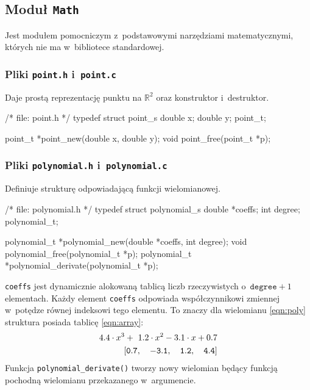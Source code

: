 \documentclass[10pt,a4paper]{article}
\newcommand{\p}[1]{\texttt{#1}}
\begin{document}
\subsection{Moduł \p{Math}}
\label{sec:modul_math}

Jest modułem pomocniczym z~podstawowymi narzędziami matematycznymi, których nie
ma w~bibliotece standardowej.

\subsubsection{Pliki \p{point.h} i~\p{point.c}}
Daje prostą reprezentację punktu na $\mathbb{R}^{2}$ oraz konstruktor i~destruktor.
\begin{SmallVerbatim}
    /* file: point.h */
    typedef struct point_s {
      double x;
      double y;
    } point_t;
    
    point_t *point_new(double x, double y);
    void point_free(point_t *p);
\end{SmallVerbatim}

\subsubsection{Pliki \p{polynomial.h} i~\p{polynomial.c}}
Definiuje strukturę odpowiadającą funkcji wielomianowej.
\begin{SmallVerbatim}
    /* file: polynomial.h */
    typedef struct polynomial_s {
      double *coeffs;
      int degree;
    } polynomial_t;
    
    polynomial_t *polynomial_new(double *coeffs, int degree);
    void polynomial_free(polynomial_t *p);
    polynomial_t *polynomial_derivate(polynomial_t *p);
\end{SmallVerbatim}
\p{coeffs} jest dynamicznie alokowaną tablicą liczb rzeczywistych
o~$\p{degree}+1$ elementach. Każdy element \p{coeffs} odpowiada współczynnikowi
zmiennej w~potędze równej indeksowi tego elementu. To znaczy dla wielomianu
\ref{eqn:poly} struktura posiada tablicę \ref{eqn:array}:
\begin{eqnarray}
  4.4 \cdot x^{3} +~1.2 \cdot x^2 - 3.1 \cdot x + 0.7 \label{eqn:poly}\\
  {\tt\left[ 0.7,\quad -3.1,\quad 1.2, \quad 4.4 \right]} \label{eqn:array}
\end{eqnarray}
Funkcja \p{polynomial\_derivate()} tworzy nowy wielomian będący funkcją
pochodną wielomianu przekazanego w~argumencie.
\end{document}
